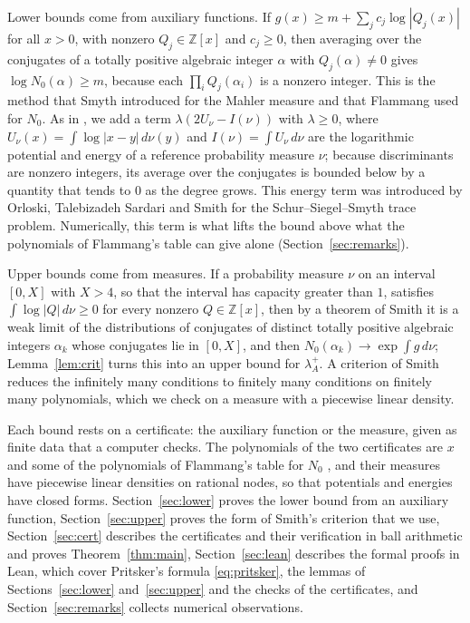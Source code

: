 \documentclass[11pt]{amsart}
\theoremstyle{remark}
\numberwithin{equation}{section}
\newcommand{\Z}{\mathbb{Z}}
\begin{document}
Lower bounds come from auxiliary functions. If $g(x)\ge m+\sum_jc_j\log|Q_j(x)|$ for all $x>0$, with nonzero $Q_j\in\Z[x]$ and $c_j\ge0$, then averaging over the conjugates of a totally positive algebraic integer $\alpha$ with $Q_j(\alpha)\ne0$ gives $\log N_0(\alpha)\ge m$, because each $\prod_iQ_j(\alpha_i)$ is a nonzero integer. This is the method that Smyth \cite{Smy81} introduced for the Mahler measure and that Flammang \cite[Section~3]{Fla15} used for $N_0$. As in \cite{Tom26a}, we add a term $\lambda(2U_\nu-I(\nu))$ with $\lambda\ge0$, where $U_\nu(x)=\int\log|x-y|\,d\nu(y)$ and $I(\nu)=\int U_\nu\,d\nu$ are the logarithmic potential and energy of a reference probability measure $\nu$; because discriminants are nonzero integers, its average over the conjugates is bounded below by a quantity that tends to $0$ as the degree grows. This energy term was introduced by Orloski, Talebizadeh Sardari and Smith \cite{OSS25} for the Schur--Siegel--Smyth trace problem. Numerically, this term is what lifts the bound above what the polynomials of Flammang's table can give alone (Section~\ref{sec:remarks}).

Upper bounds come from measures. If a probability measure $\nu$ on an interval $[0,X]$ with $X>4$, so that the interval has capacity greater than $1$, satisfies $\int\log|Q|\,d\nu\ge0$ for every nonzero $Q\in\Z[x]$, then by a theorem of Smith \cite[Theorem~1.5]{Smi24} it is a weak limit of the distributions of conjugates of distinct totally positive algebraic integers $\alpha_k$ whose conjugates lie in $[0,X]$, and then $N_0(\alpha_k)\to\exp\int g\,d\nu$; Lemma~\ref{lem:crit} turns this into an upper bound for $\lambda_A^+$. A criterion of Smith \cite[Proposition~5.15]{Smi24} reduces the infinitely many conditions to finitely many conditions on finitely many polynomials, which we check on a measure with a piecewise linear density.

Each bound rests on a certificate: the auxiliary function or the measure, given as finite data that a computer checks. The polynomials of the two certificates are $x$ and some of the polynomials of Flammang's table for $N_0$ \cite[Table~2]{Fla15}, and their measures have piecewise linear densities on rational nodes, so that potentials and energies have closed forms. Section~\ref{sec:lower} proves the lower bound from an auxiliary function, Section~\ref{sec:upper} proves the form of Smith's criterion that we use, Section~\ref{sec:cert} describes the certificates and their verification in ball arithmetic and proves Theorem~\ref{thm:main}, Section~\ref{sec:lean} describes the formal proofs in Lean, which cover Pritsker's formula \eqref{eq:pritsker}, the lemmas of Sections~\ref{sec:lower} and~\ref{sec:upper} and the checks of the certificates, and Section~\ref{sec:remarks} collects numerical observations.
\end{document}
